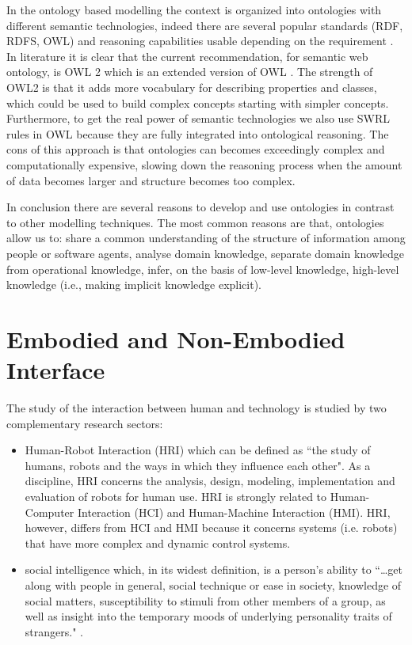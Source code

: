 \documentclass{thesisreport}
\begin{document}
In the ontology based modelling the context is organized into ontologies with different semantic technologies, indeed there are several popular standards (RDF, RDFS, OWL) and reasoning capabilities usable depending on the requirement \cite{perera2014context}. 
In literature it is clear that the current recommendation, for semantic web ontology, is OWL 2 which is an extended version of OWL \cite{perera2014context}. The strength of OWL2 is that it adds more vocabulary for describing properties and classes, which could be used to build complex concepts starting with simpler concepts.
Furthermore, to get the real power of semantic technologies we also use SWRL rules in OWL because they are fully integrated into ontological reasoning. The cons of this approach is that ontologies can becomes exceedingly complex and computationally expensive, slowing down the reasoning process when the amount of data becomes larger and structure becomes too complex.

In conclusion there are several reasons to develop and use ontologies in contrast to other modelling techniques. The most common reasons are that, ontologies allow us to: share a common understanding of the structure of information among people or software agents, analyse domain knowledge, separate domain knowledge from operational knowledge, infer, on the basis of low-level knowledge, high-level knowledge (i.e., making implicit knowledge explicit).


\section{Embodied and Non-Embodied Interface}
 The study of the interaction between human and technology is studied by two complementary research sectors:
 \begin{itemize}
    \item Human-Robot Interaction (HRI) which can be defined as ``the study of humans, robots and the ways in which they influence each other". As a discipline, HRI concerns the analysis, design, modeling, implementation and evaluation of robots for human use.
    HRI is strongly related to Human-Computer Interaction (HCI) and Human-Machine Interaction (HMI). HRI, however, differs from HCI and HMI because it concerns systems (i.e. robots) that have more complex and dynamic control systems.
     
    \item social intelligence which, in its widest definition, is a person's ability to ``\dots get along with people in general, social technique or ease in society, knowledge of social matters, susceptibility to stimuli from other members of a group, as well as insight into the temporary moods of underlying personality traits of strangers." \cite{vernon1933some}.
 \end{itemize}
\end{document}
